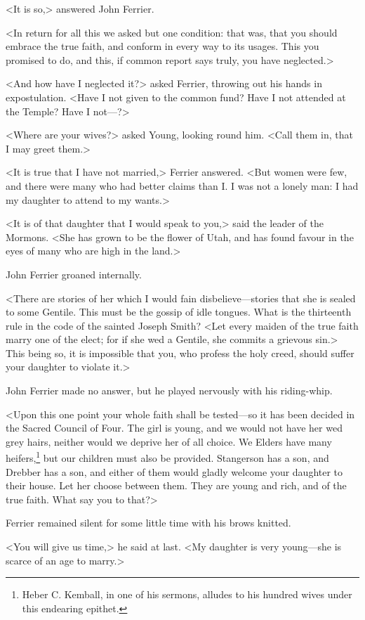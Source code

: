 <It is so,> answered John Ferrier.

<In return for all this we asked but one condition: that was, that you should embrace the true faith, and conform in every way to its usages. This you promised to do, and this, if common report says truly, you have neglected.>

<And how have I neglected it?> asked Ferrier, throwing out his hands in expostulation. <Have I not given to the common fund? Have I not attended at the Temple? Have I not—?>

<Where are your wives?> asked Young, looking round him. <Call them in, that I may greet them.>

<It is true that I have not married,> Ferrier answered. <But women were few, and there were many who had better claims than I\@. I was not a lonely man: I had my daughter to attend to my wants.>

<It is of that daughter that I would speak to you,> said the leader of the Mormons. <She has grown to be the flower of Utah, and has found favour in the eyes of many who are high in the land.>

John Ferrier groaned internally.

<There are stories of her which I would fain disbelieve—stories that she is sealed to some Gentile. This must be the gossip of idle tongues. What is the thirteenth rule in the code of the sainted Joseph Smith? <Let every maiden of the true faith marry one of the elect; for if she wed a Gentile, she commits a grievous sin.> This being so, it is impossible that you, who profess the holy creed, should suffer your daughter to violate it.>

John Ferrier made no answer, but he played nervously with his riding-whip.

<Upon this one point your whole faith shall be tested—so it has been decided in the Sacred Council of Four. The girl is young, and we would not have her wed grey hairs, neither would we deprive her of all choice. We Elders have many heifers,\footnote{Heber C. Kemball, in one of his sermons, alludes to his hundred wives under this endearing epithet.} but our children must also be provided. Stangerson has a son, and Drebber has a son, and either of them would gladly welcome your daughter to their house. Let her choose between them. They are young and rich, and of the true faith. What say you to that?>

Ferrier remained silent for some little time with his brows knitted.

<You will give us time,> he said at last. <My daughter is very young—she is scarce of an age to marry.>

